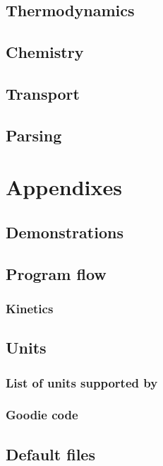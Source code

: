 \documentclass{documentation}
\begin{document}
\chapter{Thermodynamics}

\chapter{Chemistry}


\chapter{Transport}


\chapter{Parsing}


\appendix
\part{Appendixes}
\chapter{Demonstrations}
\label{demo}


\chapter{Program flow}
\label{progflow}

\section{Kinetics}
\label{progflow:kinetics}


\chapter{Units}
\section{List of units supported by \Antioch}
\label{list_units}


\section{Goodie code}
\label{unit_goodie}
{\footnotesize

}

\chapter{Default files}
\label{antioch:defaults_input}




\end{document}
